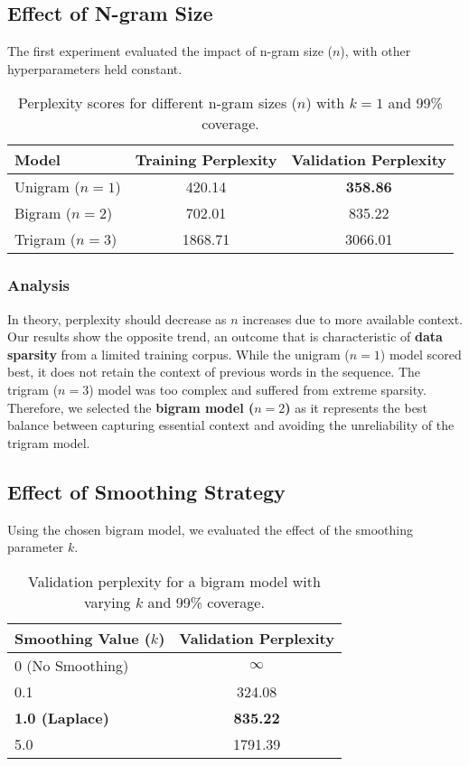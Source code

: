 \documentclass[a4paper]{article}
\begin{document}
\subsection{Effect of N-gram Size}
The first experiment evaluated the impact of n-gram size ($n$), with other hyperparameters held constant.

\begin{table}[h!]
\centering
\begin{tabular}{|l|c|c|}
\hline
\textbf{Model} & \textbf{Training Perplexity} & \textbf{Validation Perplexity} \\
\hline
Unigram ($n=1$) & 420.14 & \textbf{358.86} \\
Bigram ($n=2$) & 702.01 & 835.22 \\
Trigram ($n=3$) & 1868.71 & 3066.01 \\
\hline
\end{tabular}
\caption{Perplexity scores for different n-gram sizes ($n$) with $k=1$ and 99\% coverage.}
\label{tab:ngram_perplexity}
\end{table}

\subsubsection{Analysis}
In theory, perplexity should decrease as $n$ increases due to more available context. Our results show the opposite trend, an outcome that is characteristic of \textbf{data sparsity} from a limited training corpus. While the unigram ($n=1$) model scored best, it does not retain the context of previous words in the sequence. The trigram ($n=3$) model was too complex and suffered from extreme sparsity. Therefore, we selected the \textbf{bigram model ($n=2$)} as it represents the best balance between capturing essential context and avoiding the unreliability of the trigram model.

\subsection{Effect of Smoothing Strategy}
Using the chosen bigram model, we evaluated the effect of the smoothing parameter $k$.

\begin{table}[h!]
\centering
\begin{tabular}{|l|c|}
\hline
\textbf{Smoothing Value ($k$)} & \textbf{Validation Perplexity} \\
\hline
0 (No Smoothing) & $\infty$ \\
0.1 & 324.08 \\
\textbf{1.0 (Laplace)} & \textbf{835.22} \\
5.0 & 1791.39 \\
\hline
\end{tabular}
\caption{Validation perplexity for a bigram model with varying $k$ and 99\% coverage.}
\label{tab:smoothing_perplexity}
\end{table}
\end{document}

